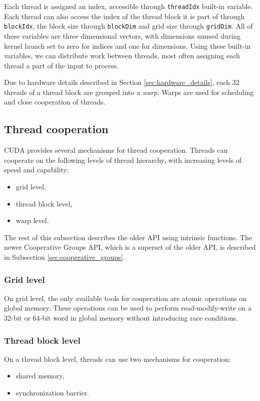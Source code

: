 Each thread is assigned an index, accessible through \texttt{threadIdx} built-in variable. Each thread can also access the index of the thread block it is part of through \texttt{blockIdx}, the block size through \texttt{blockDim} and grid size through \texttt{gridDim}. All of these variables are three dimensional vectors, with dimensions unused during kernel launch set to zero for indices and one for dimensions. Using these built-in variables, we can distribute work between threads, most often assigning each thread a part of the input to process.

Due to hardware details described in Section \ref{sec:hardware_details}, each 32 threads of a thread block are grouped into a \textit{warp}. Warps are used for scheduling and close cooperation of threads. 

\subsection{Thread cooperation}
\label{sec:thread_cooperation}
CUDA provides several mechanisms for thread cooperation. Threads can cooperate on the following levels of thread hierarchy, with increasing levels of speed and capability:

\begin{itemize}
	\item grid level,
	\item thread block level,
	\item warp level.
\end{itemize}

The rest of this subsection describes the older API using intrinsic functions. The newer Cooperative Groups API, which is a superset of the older API, is described in Subsection \ref{sec:cooperative_groups}.

\subsubsection{Grid level}
On grid level, the only available tools for cooperation are atomic operations on global memory. These operations can be used to perform read-modify-write on a 32-bit or 64-bit word in global memory without introducing race conditions.

\subsubsection{Thread block level}
On a thread block level, threads can use two mechanisms for cooperation:
\begin{itemize}
	\item shared memory,
	\item synchronization barrier.
\end{itemize}

